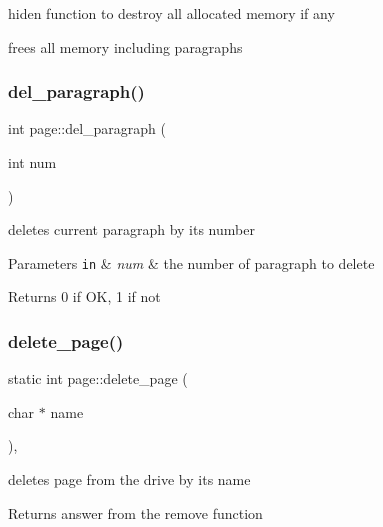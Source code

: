 hiden function to destroy all allocated memory if any 

frees all memory including paragraphs \mbox{\label{classpage_a1c55a90abfcc823c8216c9dad7660f24}} 
\subsubsection{\texorpdfstring{del\+\_\+paragraph()}{del\_paragraph()}}
{\footnotesize\ttfamily int page\+::del\+\_\+paragraph (\begin{DoxyParamCaption}\item[{int}]{num }\end{DoxyParamCaption})}

deletes current paragraph by its number 
\begin{DoxyParams}[1]{Parameters}
\mbox{\tt in}  & {\em num} & the number of paragraph to delete \\
\hline
\end{DoxyParams}
\begin{DoxyReturn}{Returns}
0 if OK, 1 if not 
\end{DoxyReturn}
\mbox{\label{classpage_a4030e9084e093da1687ed0a0ff34c9d2}} 
\subsubsection{\texorpdfstring{delete\+\_\+page()}{delete\_page()}}
{\footnotesize\ttfamily static int page\+::delete\+\_\+page (\begin{DoxyParamCaption}\item[{char $\ast$}]{name }\end{DoxyParamCaption})\hspace{0.3cm}{\ttfamily [inline]}, {\ttfamily [static]}}

deletes page from the drive by its name \begin{DoxyReturn}{Returns}
answer from the remove function 
\end{DoxyReturn}
\mbox{\label{classpage_a5182baae92ba16e0d8ac1c1b97cda5c0}} 
